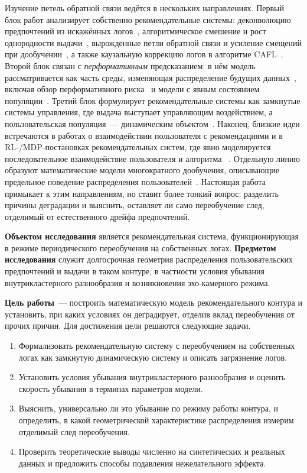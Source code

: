 Изучение петель обратной связи ведётся в нескольких направлениях. Первый блок
работ анализирует собственно рекомендательные системы: деконволюцию предпочтений
из искажённых логов~\cite{sinha2016}, алгоритмическое смешение и рост
однородности выдачи~\cite{chaney2018}, вырожденные петли обратной связи и усиление
смещений при дообучении~\cite{jiang2019, mansoury2020}, а также каузальную
коррекцию логов в алгоритме CAFL~\cite{krauth2022}. Второй блок связан с
\emph{перформативным} предсказанием: в нём модель рассматривается как часть
среды, изменяющая распределение будущих данных~\cite{perdomo2020}, включая
обзор перформативного риска~\cite{hardt2025performativePastFuture} и модели с явным
состоянием популяции~\cite{brown2022stateful}. Третий блок формулирует
рекомендательные системы как замкнутые системы управления, где выдача выступает
управляющим воздействием, а пользовательская популяция~--- динамическим
объектом~\cite{depasquale2026controlSystems, sprenger2024controlStrategies,
mariano2026optimalControl, chandrasekaran2026networkAware}. Наконец, близкие
идеи встречаются в работах о взаимодействии пользователя с рекомендациями и в
RL-/MDP-постановках рекомендательных систем, где явно моделируется
последовательное взаимодействие пользователя и алгоритма
~\cite{schmit2018, afsar2022rlSurvey, wang2021generativeFeedback}. Отдельную
линию образуют математические модели многократного дообучения, описывающие
предельное поведение распределения пользователей~\cite{khritankov2021,
veprikov2024}. Настоящая работа примыкает к этим направлениям, но ставит более
тонкий вопрос: разделить причины деградации и выяснить, оставляет ли само
переобучение след, отделимый от естественного дрейфа предпочтений.

\textbf{Объектом исследования} является рекомендательная система,
функционирующая в режиме периодического переобучения на собственных логах.
\textbf{Предметом исследования} служит долгосрочная геометрия распределения
пользовательских предпочтений и выдачи в таком контуре, в частности условия
убывания внутрикластерного разнообразия и возникновения эхо-камерного режима.

\textbf{Цель работы}~--- построить математическую модель рекомендательного
контура и установить, при каких условиях он деградирует, отделив вклад
переобучения от прочих причин. Для достижения цели решаются следующие задачи.
\begin{enumerate}
    \item Формализовать рекомендательную систему с переобучением на собственных
    логах как замкнутую динамическую систему и описать загрязнение логов.
    \item Установить условия убывания внутрикластерного разнообразия и оценить
    скорость убывания в терминах параметров модели.
    \item Выяснить, универсально ли это убывание по режиму работы контура, и
    определить, в какой геометрической характеристике распределения измерим
    отделимый след переобучения.
    \item Проверить теоретические выводы численно на синтетических и реальных
    данных и предложить способы подавления нежелательного эффекта.
\end{enumerate}

